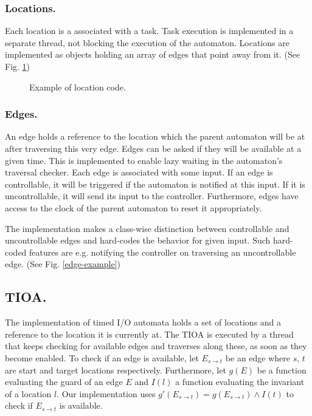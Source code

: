 \subsubsection{Locations.}

Each location is a associated with a task. Task execution is implemented
in a separate thread, not blocking the execution of the automaton.
Locations are implemented as objects holding an array of edges that
point away from it. (See Fig. \ref{location-example})

\begin{figure}[t]

\caption{Example of location code. \label{location-example}}
\end{figure}


\subsubsection{Edges.}

An edge holds a reference to the location which the parent automaton
will be at after traversing this very edge. Edges can be asked if
they will be available at a given time. This is implemented to enable
lazy waiting in the automaton's traversal checker. Each edge is associated
with some input. If an edge is controllable, it will be triggered
if the automaton is notified at this input. If it is uncontrollable,
it will send its input to the controller. Furthermore, edges have
access to the clock of the parent automaton to reset it appropriately.

The implementation makes a class-wise distinction between controllable
and uncontrollable edges and hard-codes the behavior for given input.
Such hard-coded features are e.g. notifying the controller on traversing
an uncontrollable edge. (See Fig. \ref{edge-example})


\subsection{TIOA.}

The implementation of timed I/O automata holds a set of locations
and a reference to the location it is currently at. The TIOA is executed
by a thread that keeps checking for available edges and traverses
along these, as soon as they become enabled. To check if an edge is
available, let $E_{s\rightarrow t}$ be an edge where $s,\, t$ are
start and target locations respectively. Furthermore, let $g(E)$
be a function evaluating the guard of an edge $E$ and $I(l)$ a function
evaluating the invariant of a location $l$. Our implementation uses
$g'(E_{s\rightarrow t})=g(E_{s\rightarrow t})\wedge I(t)$ to check
if $E_{s\rightarrow t}$ is available.


